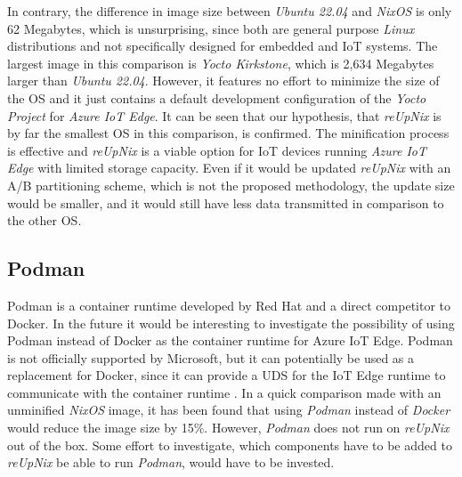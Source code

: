 \noindent
In contrary, the difference in image size between \textit{Ubuntu 22.04} and
\textit{NixOS} is only 62 Megabytes, which is unsurprising, since both are
general purpose \textit{Linux} distributions and not specifically designed
for embedded and \ac{IoT} systems. The largest image in this comparison is
\textit{Yocto Kirkstone}, which is 2,634 Megabytes larger than \textit{Ubuntu 22.04}.
However, it features no effort to minimize the size of the \ac{OS} and it
just contains a default development configuration of the \textit{Yocto Project}
for \textit{Azure IoT Edge}. It can be seen that our hypothesis, that \textit{reUpNix}
is by far the smallest \ac{OS} in this comparison, is confirmed. The minification
process is effective and \textit{reUpNix} is a viable option for \ac{IoT} devices
running \textit{Azure IoT Edge} with limited storage capacity. Even if it would be
updated \textit{reUpNix} with an A/B partitioning scheme, which is not the proposed
methodology, the update size would be smaller, and it would still have less data
transmitted in comparison to the other \ac{OS}.

\subsection{Podman}
Podman is a container runtime developed by Red Hat and a direct competitor to Docker.
In the future it would be interesting to investigate the possibility of using
Podman instead of Docker as the container runtime for Azure IoT Edge. Podman is
not officially supported by Microsoft, but it can potentially be used as a
replacement for Docker, since it can provide a \ac{UDS} for the IoT Edge runtime
to communicate with the container runtime \cite{book:3556946,msdoc-supportetplatforms}.
In a quick comparison made with an unminified \textit{NixOS} image, it has been found that
using \textit{Podman} instead of \textit{Docker} would reduce the image size by
15\%. However, \textit{Podman} does not run on \textit{reUpNix} out of the box.
Some effort to investigate, which components have to be
added to \textit{reUpNix} be able to run \textit{Podman}, would have to be invested.

